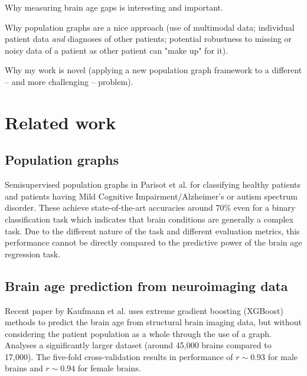 \documentclass[12pt,a4paper,twoside, openright, hidelinks]{report}
\begin{document}
Why measuring brain age gaps is interesting and important.

Why population graphs are a nice approach (use of multimodal data; individual patient data \textit{and} diagnoses of other patients; potential robustness to missing or noisy data of a patient as other patient can "make up" for it).

Why my work is novel (applying a new population graph framework to a different – and more challenging – problem).

\section{Related work}

\subsection{Population graphs}
Semisupervised population graphs in Parisot et al. for classifying healthy patients and patients having Mild Cognitive Impairment/Alzheimer's or autism spectrum disorder. These achieve state-of-the-art accuracies around 70\% even for a binary classification task which indicates that brain conditions are generally a complex task. Due to the different nature of the task and different evaluation metrics, this performance cannot be directly compared to the predictive power of the brain age regression task.

\subsection{Brain age prediction from neuroimaging data}
Recent paper by Kaufmann et al. \cite{kaufmann2019} uses extreme gradient boosting (XGBoost) methods to predict the brain age from structural brain imaging data, but without considering the patient population as a whole through the use of a graph. Analyses a significantly larger dataset (around 45,000 brains compared to 17,000). The five-fold cross-validation results in performance of $r \sim 0.93$ for male brains and $r \sim 0.94$ for female brains.
\end{document}
